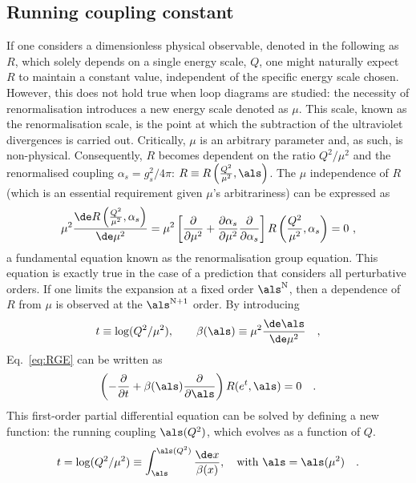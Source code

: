 \subsection{Running coupling constant}
If one considers a dimensionless physical observable, denoted in the following as $R$, which solely depends on a single energy scale, $Q$, one might naturally expect $R$ to maintain a constant value, independent of the specific energy scale chosen. However, this does not hold true when loop diagrams are studied: the necessity of renormalisation introduces a new energy scale denoted as $\mu$. This scale, known as the renormalisation scale, is the point at which the subtraction of the ultraviolet divergences is carried out. Critically, $\mu$ is an arbitrary parameter and, as such, is non-physical. Consequently, $R$ becomes dependent on the ratio $Q^2/\mu^2$ and the renormalised coupling $\alpha_s = g_s^2/4\pi$: $R \equiv R\left(\frac{Q^2}{\mu^2},\als\right)$. The $\mu$ independence of $R$ (which is an essential requirement given $\mu$'s arbitrariness) can be expressed as
\begin{equation}\label{eq:RGE}
    \mu^2 \frac{\de R\left(\frac{Q^2}{\mu^2},\alpha_s\right)}{\de \mu^2} = \mu^2 \left[\frac{\partial}{\partial\mu^2}+\frac{\partial \alpha_s}{\partial\mu^2}\frac{\partial}{\partial\alpha_s}\right]R\left(\frac{Q^2}{\mu^2},\alpha_s\right) = 0\ , 
\end{equation}
a fundamental equation known as the renormalisation group equation. This equation is exactly true in the case of a prediction that considers all perturbative orders. If one limits the expansion at a fixed order $\als^\mathrm{N}$, then a dependence of $R$ from $\mu$ is observed at the $\als^\mathrm{N+1}$ order. By introducing
\begin{equation*}
    t\equiv \mathrm{log}(Q^2/\mu^2), \qquad \beta(\als)\equiv \mu^2 \frac{\de\als}{\mathrm{\de\mu^2}}\quad ,
\end{equation*}
Eq.~\ref{eq:RGE} can be written as
\begin{equation*}
    \left(-\frac{\partial}{\partial t} + \beta(\als)\frac{\partial}{\partial \als}\right) R(e^t,\als) = 0\quad .
\end{equation*}
This first-order partial differential equation can be solved by defining a new function: the running coupling $\als(Q^2)$, which evolves as a function of $Q$.
\begin{equation}\label{eq:t_integral}
    t = \mathrm{log}(Q^2/\mu^2) \equiv \int_{\als}^{\als(Q^2)} \frac{\de x}{\beta(x)} , \quad \mathrm{with}~\als=\als(\mu^2)\quad .
\end{equation}
